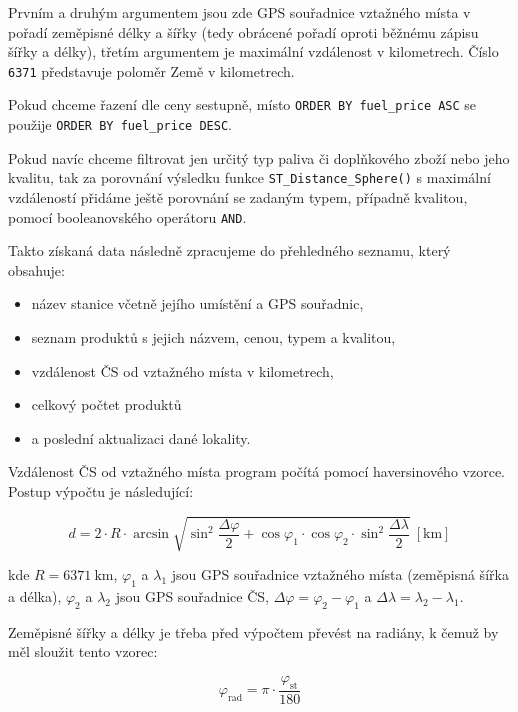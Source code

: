 Prvním a druhým argumentem jsou zde GPS souřadnice vztažného místa v pořadí
zeměpisné délky a šířky (tedy obrácené pořadí oproti běžnému zápisu šířky
a délky), třetím argumentem je maximální vzdálenost v kilometrech. Číslo
\texttt{6371} představuje poloměr Země v kilometrech.

Pokud chceme řazení dle ceny sestupně, místo \texttt{ORDER BY fuel\_price ASC}
se použije \texttt{ORDER BY fuel\_price DESC}.

Pokud navíc chceme filtrovat jen určitý typ paliva či doplňkového zboží nebo
jeho kvalitu, tak za porovnání výsledku funkce \texttt{ST\_Distance\_Sphere()}
s maximální vzdáleností přidáme ještě porovnání se zadaným typem, případně
kvalitou, pomocí booleanovského operátoru \texttt{AND}.

Takto získaná data následně zpracujeme do přehledného seznamu, který obsahuje:

\begin{itemize}
    \item název stanice včetně jejího umístění a GPS souřadnic,
    \item seznam produktů s jejich názvem, cenou, typem a kvalitou,
    \item vzdálenost ČS od vztažného místa v kilometrech,
    \item celkový počtet produktů
    \item a poslední aktualizaci dané lokality.
\end{itemize}

Vzdálenost ČS od vztažného místa program počítá pomocí haversinového vzorce.
Postup výpočtu je následující:

\begin{equation}
    \label{eq:haversine-formula}
        d   =   2 \cdot R \cdot \arcsin \sqrt{
                    \sin^2 \frac{\Delta\varphi}{2} +
                    \cos \varphi_1 \cdot \cos \varphi_2 \cdot
                    \sin^2 \frac{\Delta\lambda}{2}
                }~[\text{km}]
\end{equation}

kde \(R = 6371~\text{km}\), \(\varphi_1\) a \(\lambda_1\) jsou GPS souřadnice
vztažného místa (zeměpisná šířka a délka), \(\varphi_2\) a \(\lambda_2\)
jsou GPS souřadnice ČS, \(\Delta\varphi = \varphi_2 - \varphi_1\)
a \(\Delta\lambda = \lambda_2 - \lambda_1\).

Zeměpisné šířky a délky je třeba před výpočtem převést na radiány, k čemuž
by měl sloužit tento vzorec:

\begin{equation}
    \label{eq:deg-to-rad}
    \varphi_{\text{rad}} = \pi \cdot \frac{\varphi_{\text{st}}}{180}
\end{equation}

